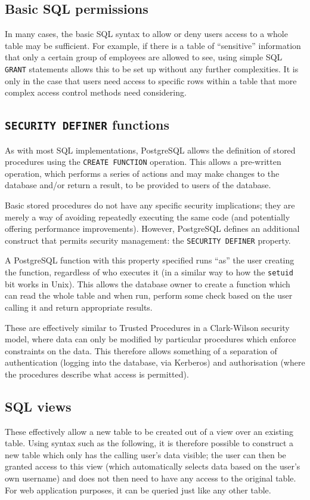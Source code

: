 \documentclass[12pt]{report}
\begin{document}
\subsection{Basic SQL permissions}
In many cases, the basic SQL syntax to allow or deny users access to a whole table may be sufficient. For example, if there is a table of ``sensitive'' information that only a certain group of employees are allowed to see, using simple SQL \texttt{GRANT} statements allows this to be set up without any further complexities. It is only in the case that users need access to specific rows within a table that more complex access control methods need considering.

\subsection{\texttt{SECURITY DEFINER} functions}
As with most SQL implementations, PostgreSQL allows the definition of stored procedures using the \texttt{CREATE FUNCTION} operation. This allows a pre-written operation, which performs a series of actions and may make changes to the database and/or return a result, to be provided to users of the database.

Basic stored procedures do not have any specific security implications; they are merely a way of avoiding repeatedly executing the same code (and potentially offering performance improvements). However, PostgreSQL defines an additional construct that permits security management: the \texttt{SECURITY DEFINER} property.

A PostgreSQL function with this property specified runs ``as'' the user creating the function, regardless of who executes it\cite{postgres-SEC_DEF} (in a similar way to how the \texttt{setuid} bit works in Unix). This allows the database owner to create a function which can read the whole table and when run, perform some check based on the user calling it and return appropriate results.

These are effectively similar to Trusted Procedures in a Clark-Wilson security model, where data can only be modified by particular procedures which enforce constraints on the data. This therefore allows something of a separation of authentication (logging into the database, via Kerberos) and authorisation (where the procedures describe what access is permitted).

\subsection{SQL views}
These effectively allow a new table to be created out of a view over an existing table. Using syntax such as the following, it is therefore possible to construct a new table which only has the calling user's data visible; the user can then be granted access to this view (which automatically selects data based on the user's own username) and does not then need to have any access to the original table. For web application purposes, it can be queried just like any other table.
\end{document}

